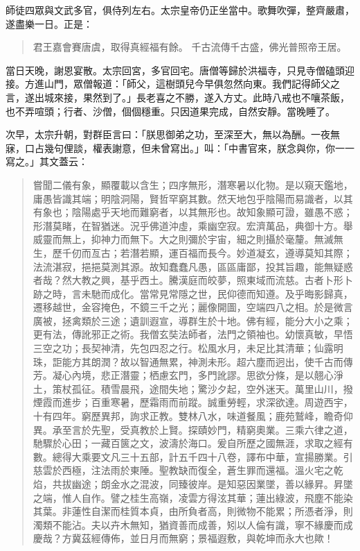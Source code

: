 師徒四眾與文武多官，俱侍列左右。太宗皇帝仍正坐當中。歌舞吹彈，整齊嚴肅，遂盡樂一日。正是：
\begin{quote}
君王嘉會賽唐虞，取得真經福有餘。
千古流傳千古盛，佛光普照帝王居。
\end{quote}

當日天晚，謝恩宴散。太宗回宮，多官回宅。唐僧等歸於洪福寺，只見寺僧磕頭迎接。方進山門，眾僧報道：「師父，這樹頭兒今早俱忽然向東。我們記得師父之言，遂出城來接，果然到了。」長老喜之不勝，遂入方丈。此時八戒也不嚷茶飯，也不弄喧頭；行者、沙僧，個個穩重。只因道果完成，自然安靜。當晚睡了。

次早，太宗升朝，對群臣言曰：「朕思御弟之功，至深至大，無以為酬。一夜無寐，口占幾句俚談，權表謝意，但未曾寫出。」叫：「中書官來，朕念與你，你一一寫之。」其文蓋云：
\begin{quote}
嘗聞二儀有象，顯覆載以含生；四序無形，潛寒暑以化物。是以窺天鑑地，庸愚皆識其端；明陰洞陽，賢哲罕窮其數。然天地包乎陰陽而易識者，以其有象也；陰陽處乎天地而難窮者，以其無形也。故知象顯可證，雖愚不惑；形潛莫睹，在智猶迷。況乎佛道沖虛，乘幽空寂。宏濟萬品，典御十方。舉威靈而無上，抑神力而無下。大之則彌於宇宙，細之則攝於毫釐。無滅無生，歷千仞而亙古；若潛若顯，運百福而長今。妙道凝玄，遵導莫知其際；法流湛寂，挹挹莫測其源。故知蠢蠢凡愚，區區庸鄙，投其旨趣，能無疑惑者哉？然大教之興，基乎西土。騰漢庭而皎夢，照東域而流慈。古者卜形卜跡之時，言未馳而成化。當常見常隱之世，民仰德而知遵。及乎晦影歸真，遷移越世，金容掩色，不鏡三千之光；麗像開圖，空端四八之相。於是微言廣被，拯禽類於三途；遺訓遐宣，導群生於十地。佛有經，能分大小之乘；更有法，傳訛邪正之術。我僧玄奘法師者，法門之領袖也。幼懷真敏，早悟三空之功；長契神清，先包四忍之行。松風水月，未足比其清華；仙露明珠，詎能方其朗潤？故以智通無累，神測未形。超六塵而迥出，使千古而傳芳。凝心內境，悲正潛靈；栖慮玄門，多門訛謬。思欲分條，是以翹心淨土，策杖孤征。積雪晨飛，途間失地；驚沙夕起，空外迷天。萬里山川，撥煙霞而進步；百重寒暑，歷霜雨而前蹤。誠重勞輕，求深欲達。周遊西宇，十有四年。窮歷異邦，詢求正教。雙林八水，味道餐風；鹿苑鷲峰，瞻奇仰異。承至言於先聖，受真教於上賢。探賾妙門，精窮奧業。三乘六律之道，馳驟於心田；一藏百篋之文，波濤於海口。爰自所歷之國無涯，求取之經有數。總得大乘要文凡三十五部，計五千四十八卷，譯布中華，宣揚勝業。引慈雲於西極，注法雨於東陲。聖教缺而復全，蒼生罪而還福。溫火宅之乾焰，共拔幽途；朗金水之混波，同臻彼岸。是知惡因業墜，善以緣昇。昇墜之端，惟人自作。譬之桂生高嶺，凌雲方得泫其華；蓮出綠波，飛塵不能染其葉。非蓮性自潔而桂質本貞，由所負者高，則微物不能累；所憑者淨，則濁類不能沾。夫以卉木無知，猶資善而成善，矧以人倫有識，寧不緣慶而成慶哉？方冀茲經傳佈，並日月而無窮；景福遐敷，與乾坤而永大也歟！
\end{quote}

